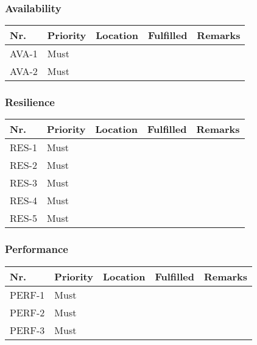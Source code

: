 \subsubsection{Availability}
\begin{table}
    \begin{tabular}{lllll}
    
        Nr.   & Priority & Location & Fulfilled & Remarks \\ \hline
        AVA-1 & Must     & ~        & ~         & ~       \\ 
        AVA-2 & Must     & ~        & ~         & ~       \\

    \end{tabular}
\end{table}

\subsubsection{Resilience}
\begin{table}
    \begin{tabular}{lllll}
    
        Nr.   & Priority & Location & Fulfilled & Remarks \\ \hline
        RES-1 & Must     & ~        & ~         & ~       \\ 
        RES-2 & Must     & ~        & ~         & ~       \\ 
        RES-3 & Must     & ~        & ~         & ~       \\ 
        RES-4 & Must     & ~        & ~         & ~       \\ 
        RES-5 & Must     & ~        & ~         & ~       \\

    \end{tabular}
\end{table}

\subsubsection{Performance}
\begin{table}
    \begin{tabular}{lllll}
    
        Nr.    & Priority & Location & Fulfilled & Remarks \\ \hline
        PERF-1 & Must     & ~        & ~         & ~       \\ 
        PERF-2 & Must     & ~        & ~         & ~       \\ 
        PERF-3 & Must     & ~        & ~         & ~       \\

    \end{tabular}
\end{table}


